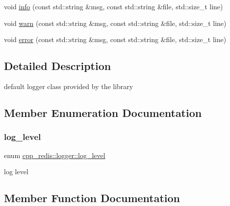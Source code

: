 \begin{DoxyCompactItemize}
\item 
void \mbox{\hyperlink{classcpp__redis_1_1logger_a04c741b5110946e76bb23728da6fb2ac}{info}} (const std\+::string \&msg, const std\+::string \&file, std\+::size\+\_\+t line)
\item 
void \mbox{\hyperlink{classcpp__redis_1_1logger_ae9359429428786c7b5605a1109508ae5}{warn}} (const std\+::string \&msg, const std\+::string \&file, std\+::size\+\_\+t line)
\item 
void \mbox{\hyperlink{classcpp__redis_1_1logger_aaf7f2837511f4414a4d7b7b923ebc15e}{error}} (const std\+::string \&msg, const std\+::string \&file, std\+::size\+\_\+t line)
\end{DoxyCompactItemize}


\subsection{Detailed Description}
default logger class provided by the library 

\subsection{Member Enumeration Documentation}
\mbox{\label{classcpp__redis_1_1logger_a9493594d547e7abe71b8690be1946c7a}} 
\subsubsection{\texorpdfstring{log\+\_\+level}{log\_level}}
{\footnotesize\ttfamily enum \mbox{\hyperlink{classcpp__redis_1_1logger_a9493594d547e7abe71b8690be1946c7a}{cpp\+\_\+redis\+::logger\+::log\+\_\+level}}\hspace{0.3cm}{\ttfamily [strong]}}

log level 

\subsection{Member Function Documentation}
\mbox{\label{classcpp__redis_1_1logger_a36e0908e7b05850b663a4b8b9cdbc299}} 
